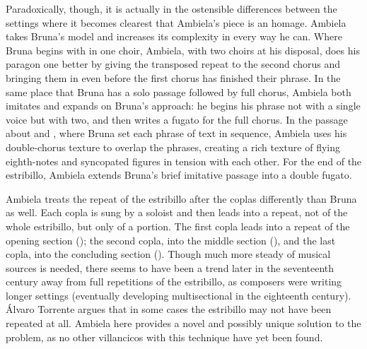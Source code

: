 Paradoxically, though, it is actually in the ostensible differences between the
settings where it becomes clearest that Ambiela's piece is an homage.
Ambiela takes Bruna's model and increases its complexity in every way he can.
Where Bruna begins with  in one choir, Ambiela, with two choirs
at his disposal, does his paragon one better by giving the transposed repeat to
the second chorus and bringing them in even before the first chorus has
finished their phrase.
In the same place that Bruna has a solo passage followed by full chorus,
Ambiela both imitates and expands on Bruna's approach: he begins his phrase not
with a single voice but with two, and then writes a fugato for the full chorus.
In the passage about  and , where Bruna set
each phrase of text in sequence, Ambiela uses his double-chorus texture to
overlap the phrases, creating a rich texture of flying eighth-notes and
syncopated figures in tension with each other.
For the end of the estribillo, Ambiela extends Bruna's brief imitative passage
into a double fugato.

Ambiela treats the repeat of the estribillo after the coplas differently than
Bruna as well.
Each copla is sung by a soloist and then leads into a repeat, not of the whole
estribillo, but only of a portion.
The first copla leads into a repeat of the opening section ();
the second copla, into the middle section (), and the last
copla, into the concluding section ().
Though much more steady of musical sources is needed, there seems to have been
a trend later in the seventeenth century away from full repetitions of the
estribillo, as composers were writing longer settings (eventually developing
multisectional  in the eighteenth century).
Álvaro Torrente argues that in some cases the estribillo may not have been
repeated at all.%
Ambiela here provides a novel and possibly unique solution to the problem, as
no other villancicos with this technique have yet been found.

